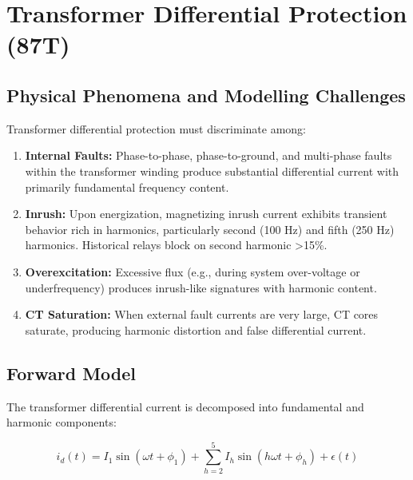 \documentclass[12pt,a4paper]{article}
\begin{document}
\section{Transformer Differential Protection (87T)}
\label{sec:87t}

\subsection{Physical Phenomena and Modelling Challenges}
\label{subsec:87t_physics}

Transformer differential protection must discriminate among:

\begin{enumerate}
    \item \textbf{Internal Faults:} Phase-to-phase, phase-to-ground, and multi-phase faults 
    within the transformer winding produce substantial differential current with primarily 
    fundamental frequency content.
    
    \item \textbf{Inrush:} Upon energization, magnetizing inrush current exhibits transient 
    behavior rich in harmonics, particularly second (100 Hz) and fifth (250 Hz) harmonics. 
    Historical relays block on second harmonic >15\%.
    
    \item \textbf{Overexcitation:} Excessive flux (e.g., during system over-voltage or 
    underfrequency) produces inrush-like signatures with harmonic content.
    
    \item \textbf{CT Saturation:} When external fault currents are very large, CT cores 
    saturate, producing harmonic distortion and false differential current.
\end{enumerate}

\subsection{Forward Model}
\label{subsec:87t_model}

The transformer differential current is decomposed into fundamental and harmonic components:

\begin{equation}
i_d(t) = I_1 \sin(\omega t + \phi_1) + \sum_{h=2}^{5} I_h \sin(h\omega t + \phi_h) + \epsilon(t)
\label{eq:87t_signal}
\end{equation}
\end{document}
